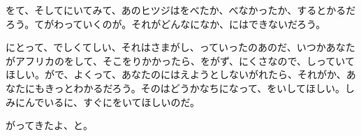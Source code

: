 をて、そしてにいてみて、あのヒツジはをべたか、べなかったか、するとかるだろう。てがわっていくのが。それがどんなになか、にはできないだろう。

にとって、でしくてしい、それはさまがし、っていったのあのだ、いつかあなたがアフリカのをして、そこをりかかったら、をがず、にくさなので、しっていてほしい。がで、よくって、あなたのにはえようとしないがれたら、それがか、あなたにもきっとわかるだろう。そのはどうかなちになって、をいしてほしい。しみにんでいるに、すぐにをいてほしいのだ。

がってきたよ、と。


